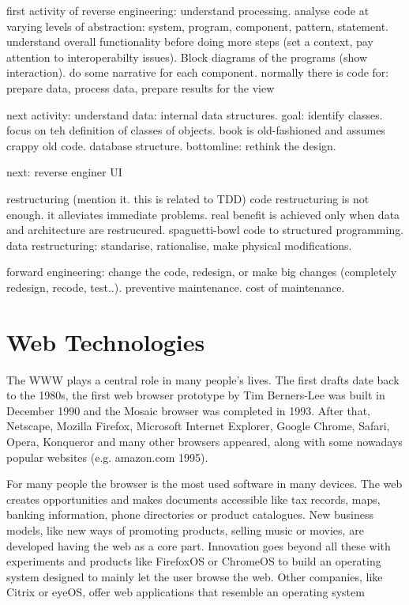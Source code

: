 first activity of reverse engineering: understand processing. analyse code at varying levels of abstraction: system, program, component, pattern, statement. 
understand overall functionality before doing more steps (set a context, pay attention to interoperabilty issues). Block diagrams of the programs (show interaction). do some narrative for each component.
normally there is code for: prepare data, process data, prepare results for the view

next activity: understand data:
internal data structures. goal: identify classes. focus on teh definition of classes of objects. book is old-fashioned and assumes crappy old code.
database structure. bottomline: rethink the design.

next: reverse enginer UI

restructuring
(mention it. this is related to TDD)
code restructuring is not enough. it alleviates immediate problems. real benefit is achieved only when data and architecture are restrucured. spaguetti-bowl code to structured programming.
data restructuring: standarise, rationalise, make physical modifications.

forward engineering: change the code, redesign, or make big changes (completely redesign, recode, test..). preventive maintenance. cost of maintenance.


\section{Web Technologies}
The \ac{WWW} plays a central role in many people's lives.
The first drafts date back to the 1980s, the first web browser prototype by Tim Berners-Lee was built in December 1990 and the Mosaic browser was completed in 1993.
After that, Netscape, Mozilla Firefox, Microsoft Internet Explorer, Google Chrome, Safari, Opera, Konqueror and many other browsers appeared, along with some nowadays popular websites (e.g. amazon.com 1995).

For many people the browser is the most used software in many devices. 
The web creates opportunities and makes documents accessible like tax records, maps, banking information, phone directories or product catalogues.
New business models, like new ways of promoting products, selling music or movies, are developed having the web as a core part.
Innovation goes beyond all these with experiments and products like FirefoxOS or ChromeOS to build an operating system designed to mainly let the user browse the web. 
Other companies, like Citrix or eyeOS, offer web applications that resemble an operating system %

